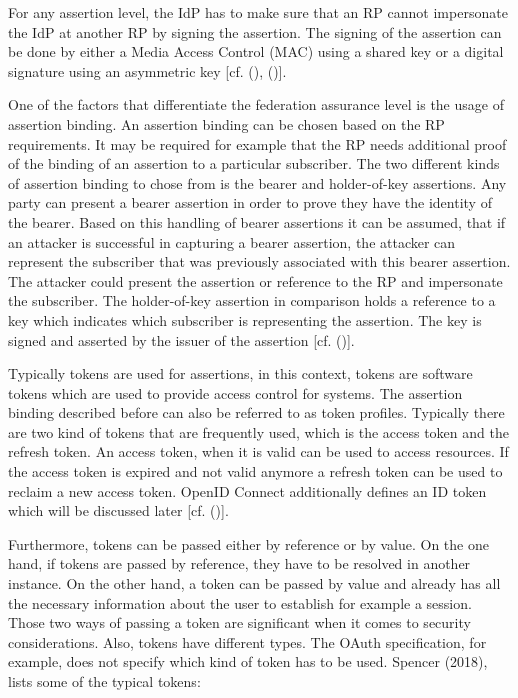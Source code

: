 For any assertion level, the IdP has to make sure that an RP cannot impersonate the IdP at another RP by signing the assertion. The signing of the assertion can be done by either a Media Access Control (MAC) using a shared key or a digital signature using an asymmetric key [cf. (\cite{NIST:2017:DIG}), (\cite{NIST:2017:DIGFA})].  

One of the factors that differentiate the federation assurance level is the usage of assertion binding. An assertion binding can be chosen based on the RP requirements. It may be required for example that the RP needs additional proof of the binding of an assertion to a particular subscriber. The two different kinds of assertion binding to chose from is the bearer and holder-of-key assertions. Any party can present a bearer assertion in order to prove they have the identity of the bearer. Based on this handling of bearer assertions it can be assumed, that if an attacker is successful in capturing a bearer assertion, the attacker can represent the subscriber that was previously associated with this bearer assertion. The attacker could present the assertion or reference to the RP and impersonate the subscriber. The holder-of-key assertion in comparison holds a reference to a key which indicates which subscriber is representing the assertion. The key is signed and asserted by the issuer of the assertion [cf. (\cite{NIST:2017:DIGFA})].

Typically tokens are used for assertions, in this context, tokens are software tokens which are used to provide access control for systems. The assertion binding described before can also be referred to as token profiles. Typically there are two kind of tokens that are frequently used, which is the access token and the refresh token. An access token, when it is valid can be used to access resources. If the access token is expired and not valid anymore a refresh token can be used to reclaim a new access token. OpenID Connect additionally defines an ID token which will be discussed later [cf. (\cite{Spencer:2018:APISecurity})]. 

Furthermore, tokens can be passed either by reference or by value. On the one hand, if tokens are passed by reference, they have to be resolved in another instance. On the other hand, a token can be passed by value and already has all the necessary information about the user to establish for example a session. Those two ways of passing a token are significant when it comes to security considerations. Also, tokens have different types. The OAuth specification, for example, does not specify which kind of token has to be used. Spencer (2018), lists some of the typical tokens: 

